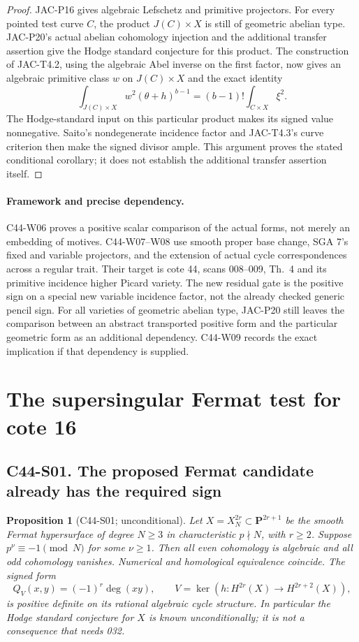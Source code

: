 \documentclass[11pt]{article}
\newtheorem{proposition}[theorem]{Proposition}
\theoremstyle{remark}\newtheorem{remark}[theorem]{Remark}
\begin{document}
\begin{proof}
JAC-P16 gives algebraic Lefschetz and primitive projectors. For
every pointed test curve $C$, the product $J(C)\times X$ is still
of geometric abelian type. JAC-P20's actual abelian cohomology
injection and the additional transfer assertion give the Hodge
standard conjecture for this product. The construction of
JAC-T4.2, using the algebraic Abel inverse on the first factor,
now gives an algebraic primitive class $w$ on $J(C)\times X$ and
the exact identity
\[
 \int_{J(C)\times X}w^2(\theta+h)^{b-1}
       =(b-1)!\int_{C\times X}\xi^2.
\]
The Hodge-standard input on this particular product makes its
signed value nonnegative. Saito's nondegenerate incidence factor
and JAC-T4.3's curve criterion then make the signed divisor ample.
This argument proves the stated conditional corollary; it does
not establish the additional transfer assertion itself.
\end{proof}

\paragraph{Framework and precise dependency.}
C44-W06 proves a positive scalar comparison of the actual forms,
not merely an embedding of motives. C44-W07--W08 use smooth
proper base change, SGA 7's fixed and variable projectors, and
the extension of actual cycle correspondences across a regular
trait. Their target is cote 44, scans 008--009, Th.~4 and its
primitive incidence higher Picard variety. The new residual gate
is the positive sign on a special new variable incidence factor,
not the already checked generic pencil sign. For all varieties
of geometric abelian type, JAC-P20 still leaves the comparison
between an abstract transported positive form and the particular
geometric form as an additional dependency. C44-W09 records
the exact implication if that dependency is supplied.


\section{The supersingular Fermat test for cote 16}

\subsection*{C44-S01. The proposed Fermat candidate already has the required sign}

\begin{proposition}[C44-S01; unconditional]
Let $X=X_N^{2r}\subset\mathbf P^{2r+1}$ be the smooth Fermat
hypersurface of degree $N\geq3$ in characteristic $p\nmid N$,
with $r\geq2$.  Suppose $p^\nu\equiv-1\pmod N$ for some
$\nu\geq1$.  Then all even cohomology is algebraic and all odd
cohomology vanishes.  Numerical and homological equivalence
coincide.  The signed form
\[
 Q_V(x,y)=(-1)^r\deg(xy),\qquad
 V=\ker(h:H^{2r}(X)\longrightarrow H^{2r+2}(X)),
\]
is positive definite on its rational algebraic cycle structure.
In particular the Hodge standard conjecture for $X$ is known
unconditionally; it is not a consequence that needs 032.
\end{proposition}
\end{document}
